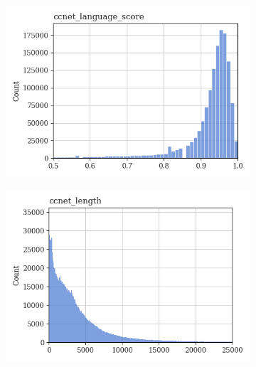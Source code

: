 \documentclass{article}
\begin{document}
\begin{figure}
     \centering
     \begin{subfigure}[b]{0.32\textwidth}
         \centering
         \includegraphics[width=\textwidth]{figures/quality_signals/ccnet_language_score.png}
     \end{subfigure}
     \hfill
     \begin{subfigure}[b]{0.32\textwidth}
         \centering
         \includegraphics[width=\textwidth]{figures/quality_signals/ccnet_length.png}
     \end{subfigure}
     \hfill
     \begin{subfigure}[b]{0.32\textwidth}
         \centering

\end{subfigure}
\end{figure}
\end{document}
